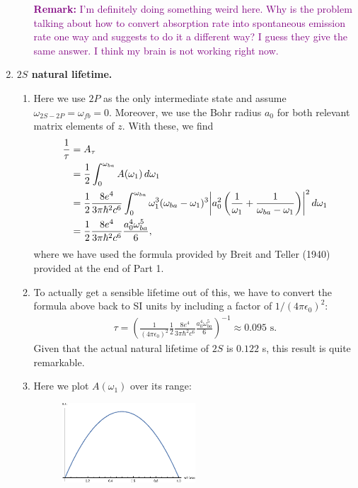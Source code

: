 \documentclass{article}
\theoremstyle{definition}
\newcommand{\f}[2]{\frac{#1}{#2}}
\newcommand{\lp}{\left(}
\newcommand{\rp}{\right)}
\begin{document}
\begin{enumerate}
\begin{enumerate}[label=(\roman*)]
		
		\textcolor{purple}{\textbf{Remark:} I'm definitely doing something weird here. Why is the problem talking about how to convert absorption rate into spontaneous emission rate one way and suggests to do it a different way? I guess they give the same answer. I think my brain is not working right now.}
		
		
	\end{enumerate}
	
	
	\item \textbf{$2S$ natural lifetime.}
	
	\begin{enumerate}[label=(\roman*)]
		\item Here we use $2P$ as the only intermediate state and assume $\omega_{2S-2P} = \omega_{fb} =  0$. Moreover, we use the Bohr radius $a_0$ for both relevant matrix elements of $z$. With these, we find 
		\begin{align*}
		\f{1}{\tau} &= A_\tau\\
		&= \f{1}{2}\int^{\omega_{ba}}_0  A(\omega_1)\,d\omega_1 \\
		&= \f{1}{2}\f{8e^4}{3\pi \hbar^2 c^6} \int_0^{\omega_{ba}} \omega_1^3 (\omega_{ba} - \omega_1)^3  \abs{a_0^2  \lp \f{1}{\omega_1} + \f{1}{\omega_{ba} - \omega_1}\rp}^2\,d\omega_1\\
		&=  \f{1}{2}\f{8e^4}{3\pi \hbar^2 c^6} \f{a_0^4 \omega_{ba}^5}{6},
		\end{align*}  
		where we have used the formula provided by Breit and Teller (1940) provided at the end of Part 1. 
		
		\item To actually get a sensible lifetime out of this, we have to convert the formula above back to SI units by including a factor of $1/(4\pi \epsilon_0)^2$:
		\begin{align*}
		\tau = \lp \f{1}{(4\pi\epsilon_0)^2} \f{1}{2}\f{8e^4}{3\pi \hbar^2 c^6} \f{a_0^4 \omega_{ba}^5}{6}\rp^{-1} \approx 0.095 \text{ s}. 
		\end{align*}
		Given that the actual natural lifetime of $2S$ is $0.122$ s, this result is quite remarkable. 
		
		\item Here we plot $A(\omega_1)$ over its range:
		\begin{figure}[!htb]
			\centering
			\includegraphics[width=0.5\textwidth]{aw1.eps}
		\end{figure}

	\end{enumerate}
\end{enumerate}
	
	
\end{document}
